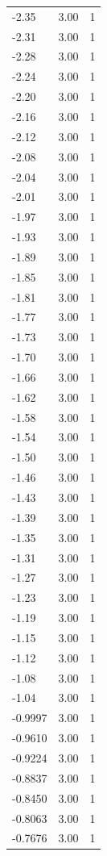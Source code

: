 \begin{longtable}{lrr}
  -2.35 & 3.00 & 1 \\
  -2.31 & 3.00 & 1 \\
  -2.28 & 3.00 & 1 \\
  -2.24 & 3.00 & 1 \\
  -2.20 & 3.00 & 1 \\
  -2.16 & 3.00 & 1 \\
  -2.12 & 3.00 & 1 \\
  -2.08 & 3.00 & 1 \\
  -2.04 & 3.00 & 1 \\
  -2.01 & 3.00 & 1 \\
  -1.97 & 3.00 & 1 \\
  -1.93 & 3.00 & 1 \\
  -1.89 & 3.00 & 1 \\
  -1.85 & 3.00 & 1 \\
  -1.81 & 3.00 & 1 \\
  -1.77 & 3.00 & 1 \\
  -1.73 & 3.00 & 1 \\
  -1.70 & 3.00 & 1 \\
  -1.66 & 3.00 & 1 \\
  -1.62 & 3.00 & 1 \\
  -1.58 & 3.00 & 1 \\
  -1.54 & 3.00 & 1 \\
  -1.50 & 3.00 & 1 \\
  -1.46 & 3.00 & 1 \\
  -1.43 & 3.00 & 1 \\
  -1.39 & 3.00 & 1 \\
  -1.35 & 3.00 & 1 \\
  -1.31 & 3.00 & 1 \\
  -1.27 & 3.00 & 1 \\
  -1.23 & 3.00 & 1 \\
  -1.19 & 3.00 & 1 \\
  -1.15 & 3.00 & 1 \\
  -1.12 & 3.00 & 1 \\
  -1.08 & 3.00 & 1 \\
  -1.04 & 3.00 & 1 \\
  -0.9997 & 3.00 & 1 \\
  -0.9610 & 3.00 & 1 \\
  -0.9224 & 3.00 & 1 \\
  -0.8837 & 3.00 & 1 \\
  -0.8450 & 3.00 & 1 \\
  -0.8063 & 3.00 & 1 \\
  -0.7676 & 3.00 & 1 \\

\end{longtable}
